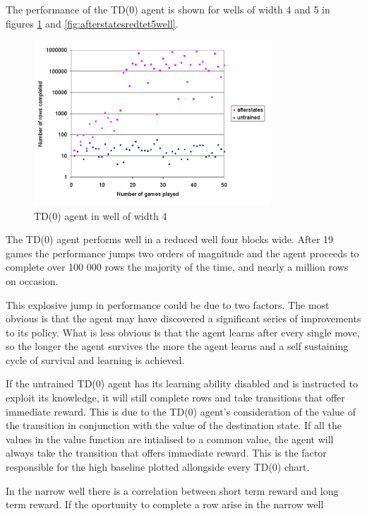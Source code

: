 \documentclass{rucsthesis}
\begin{document}
The performance of the TD(0) agent is shown for wells of width 4 and 5 in figures \ref{fig:afterstatesredtet4well} and \ref{fig:afterstatesredtet5well}.

\begin{figure}[h]
\centering
\includegraphics[width=3.5in]{afterstatesredtet4well.png}
\caption{TD(0) agent in well of width 4}
\label{fig:afterstatesredtet4well}
\end{figure}

The TD(0) agent performs well in a reduced well four blocks wide. After 19 games the performance jumps two orders of magnitude and the agent proceeds to complete over 100 000 rows the majority of the time, and nearly a million rows on occasion.

This explosive jump in performance could be due to two factors. The most obvious is that the agent may have discovered a significant series of improvements to its policy. What is less obvious is that the agent learns after every single move, so the longer the agent survives the more the agent learns and a self sustaining cycle of survival and learning is achieved.

If the untrained TD(0) agent has its learning ability disabled and is instructed to exploit its knowledge, it will still complete rows and take transitions that offer immediate reward. This is due to the TD(0) agent's consideration of the value of the transition in conjunction with the value of the destination state. If all the values in the value function are intialised to a common value, the agent will always take the transition that offers immediate reward. This is the factor responsible for the high baseline plotted allongside every TD(0) chart. 

In the narrow well there is a correlation between short term reward and long term reward. If the oportunity to complete a row arise in the narrow well 
\end{document}

